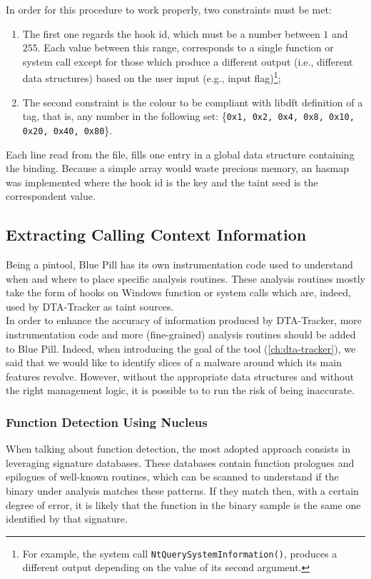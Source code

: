 \documentclass[LaM,binding=0.6cm]{sapthesis}
\begin{document}
In order for this procedure to work properly, two constraints must be met:
\begin{enumerate}
\item The first one regards the hook id, which must be a number between $1$ and $255$. Each value between this range, corresponds to a single function or system call except for those which produce a different output (i.e., different data structures) based on the user input (e.g., input flag)\footnote{For example, the system call \texttt{NtQuerySystemInformation()}, produces a different output depending on the value of its second argument.};
\item The second constraint is the colour to be compliant with libdft definition of a tag, that is, any number in the following set: \{\texttt{0x1, 0x2, 0x4, 0x8, 0x10, 0x20, 0x40, 0x80}\}.
\end{enumerate}
Each line read from the file, fills one entry in a global data structure containing the binding. Because a simple array would waste precious memory, an hasmap was implemented where the hook id is the key and the taint seed is the correspondent value.

\subsection{Extracting Calling Context Information}
Being a pintool, Blue Pill has its own instrumentation code used to understand when and where to place specific analysis routines. These analysis routines mostly take the form of hooks on Windows function or system calls which are, indeed, used by DTA-Tracker as taint sources.\\

In order to enhance the accuracy of information produced by DTA-Tracker, more instrumentation code and more (fine-grained) analysis routines should be added to Blue Pill. Indeed, when introducing the goal of the tool (\autoref{ch:dta-tracker}), we said that we would like to identify slices of a malware around which its main features revolve. However, without the appropriate data structures and without the right management logic, it is possible to to run the risk of being inaccurate.

\subsubsection{Function Detection Using Nucleus\cite{andriesse2017compiler}}
When talking about function detection, the most adopted approach consists in leveraging signature databases. These databases contain function prologues and epilogues of well-known routines, which can be scanned to understand if the binary under analysis matches these patterns. If they match then, with a certain degree of error, it is likely that the function in the binary sample is the same one identified by that signature.
\end{document}
